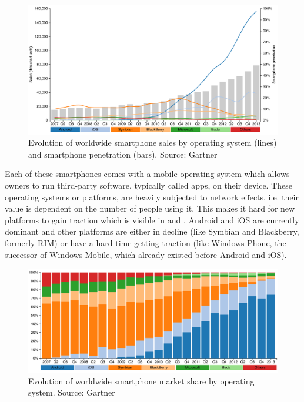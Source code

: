 \begin{figure}[h]
    \begin{center}
        \includegraphics[width=\textwidth]{figs/smartphone_sales.pdf}
        	\caption{
        	    Evolution of worldwide smartphone sales by operating system (lines) and smartphone penetration (bars). Source: Gartner \citeGartner
        	}
        	\label{fig:smartphone-sales}
    \end{center}
\end{figure}

Each of these smartphones comes with a mobile operating system which allows owners to run third-party software, typically called apps, on their device. These operating systems or platforms, are heavily subjected to network effects, i.e. their value is dependent on the number of people using it. This makes it hard for new platforms to gain traction which is visible in  and . Android and iOS are currently dominant and other platforms are either in decline (like Symbian and Blackberry, formerly RIM) or have a hard time getting traction (like Windows Phone, the successor of Windows Mobile, which already existed before Android and iOS).

\begin{figure}[h]
    \begin{center}
        \includegraphics[width=\textwidth]{figs/smartphone_share.pdf}
        \caption{
            Evolution of worldwide smartphone market share by operating system.\newline 
            Source: Gartner \citeGartner
        	}
        \label{fig:smartphone-share}
    \end{center}
\end{figure}

